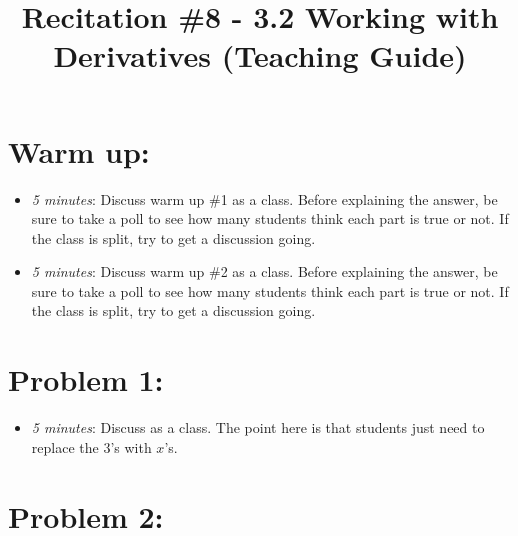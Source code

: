 \documentclass[handout,nooutcomes]{ximera}
\title{Recitation \#8 - 3.2 Working with Derivatives (Teaching Guide)}
\begin{document}
\begin{abstract}		\end{abstract}
\maketitle


\section*{Warm up:} 
	
	\begin{itemize}
	
	\item  \emph{5 minutes}:  Discuss warm up \#1 as a class.  Before explaining the answer, be sure to take a poll to see how many students think each part is true or not.  If the class is split, try to get a discussion going.
	
	\item  \emph{5 minutes}:  Discuss warm up \#2 as a class.  Before explaining the answer, be sure to take a poll to see how many students think each part is true or not.  If the class is split, try to get a discussion going.
	
	\end{itemize}


\section*{Problem 1:}

	\begin{itemize}
	
	\item  \emph{5 minutes}:  Discuss as a class.  The point here is that students just need to replace the $3$'s with $x$'s.
			
	\end{itemize}
	
	
	
\section*{Problem 2:}
\end{document}
